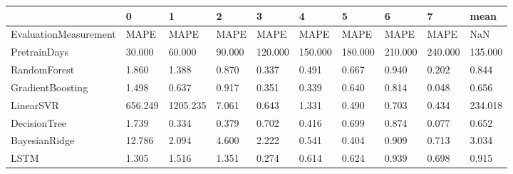 \begin{tabular}{llllllllll}
\toprule
{} &       0 &        1 &      2 &       3 &       4 &       5 &       6 &       7 &    mean \\
\midrule
EvaluationMeasurement &    MAPE &     MAPE &   MAPE &    MAPE &    MAPE &    MAPE &    MAPE &    MAPE &     NaN \\
PretrainDays          &  30.000 &   60.000 & 90.000 & 120.000 & 150.000 & 180.000 & 210.000 & 240.000 & 135.000 \\
RandomForest          &   1.860 &    1.388 &  0.870 &   0.337 &   0.491 &   0.667 &   0.940 &   0.202 &   0.844 \\
GradientBoosting      &   1.498 &    0.637 &  0.917 &   0.351 &   0.339 &   0.640 &   0.814 &   0.048 &   0.656 \\
LinearSVR             & 656.249 & 1205.235 &  7.061 &   0.643 &   1.331 &   0.490 &   0.703 &   0.434 & 234.018 \\
DecisionTree          &   1.739 &    0.334 &  0.379 &   0.702 &   0.416 &   0.699 &   0.874 &   0.077 &   0.652 \\
BayesianRidge         &  12.786 &    2.094 &  4.600 &   2.222 &   0.541 &   0.404 &   0.909 &   0.713 &   3.034 \\
LSTM                  &   1.305 &    1.516 &  1.351 &   0.274 &   0.614 &   0.624 &   0.939 &   0.698 &   0.915 \\
\bottomrule
\end{tabular}
